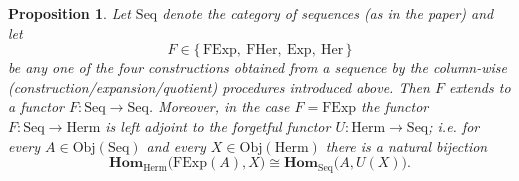 \documentclass[11pt]{book}
\theoremstyle{definition}
\theoremstyle{plain}
\newtheorem{proposition}[theorem]{Proposition}
\theoremstyle{remark}
\begin{document}
\begin{proposition}\label{prop:functoriality-and-adjunction}
Let \( \mathrm{Seq} \) denote the category of sequences (as in the paper) and let
\[
    F\in\{\,\mathrm{FExp},\ \mathrm{FHer},\ \mathrm{Exp},\ \mathrm{Her}\,\}
\]
be any one of the four constructions obtained from a sequence by the column-wise
(construction/expansion/quotient) procedures introduced above.  Then \(F\) extends
to a functor \(F:\mathrm{Seq}\to\mathrm{Seq}\).
Moreover, in the case \(F=\mathrm{FExp}\) the functor \(F:\mathrm{Seq}\to\mathrm{Herm}\) is left adjoint to the
forgetful functor \(U:\mathrm{Herm}\to\mathrm{Seq}\); i.e. for every \(A\in\mathrm{Obj}(\mathrm{Seq})\) and
every \(X\in\mathrm{Obj}(\mathrm{Herm})\) there is a natural bijection
\[
    \mathbf{Hom}_{\mathrm{Herm}}\big(\mathrm{FExp}(A),X\big)\cong \mathbf{Hom}_{\mathrm{Seq}}\big(A,U(X)\big).
\]
\end{proposition}
\end{document}

